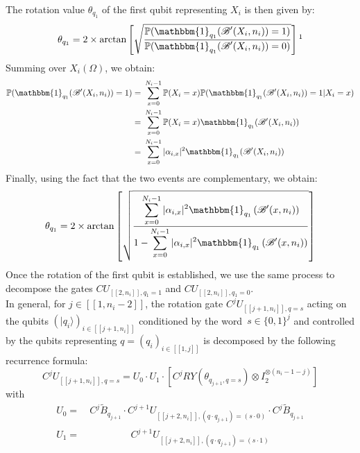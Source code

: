 The rotation value $\theta_{q_1}$ of the first qubit representing $X_i$ is then given by:
\begin{align*}
    \theta_{q_1} = 2\times\mathrm{arctan}\left[\sqrt{\frac{\displaystyle \mathbb{P}(\mathbbm{1}_{q_1}(\mathscr{B}'(X_i,n_i))=1)}{\displaystyle \mathbb{P}(\mathbbm{1}_{q_1}(\mathscr{B}'(X_i,n_i))=0)}}\right] \footnotemark
\end{align*}
Summing over $X_i(\Omega)$, we obtain:
\begin{align*}
    \mathbb{P}(\mathbbm{1}_{q_1}(\mathscr{B}'(X_i,n_i))=1) =&\ \sum_{x=0}^{N_i-1}\mathbb{P}(X_i=x)\mathbb{P}(\mathbbm{1}_{q_1}(\mathscr{B}'(X_i,n_i))=1|X_i=x) \\
    =&\ \sum_{x=0}^{N_i-1}\mathbb{P}(X_i=x)\mathbbm{1}_{q_1}(\mathscr{B}'(X_i,n_i)) \\
    =&\ \sum_{x=0}^{N_i-1}|\alpha_{i,x}|^2\mathbbm{1}_{q_1}(\mathscr{B}'(X_i,n_i))
\end{align*}
Finally, using the fact that the two events are complementary, we obtain: 
\begin{align*}
    \theta_{q_1} = 2\times\mathrm{arctan}\left[\sqrt{\frac{\displaystyle \sum_{x=0}^{N_i-1}|\alpha_{i,x}|^2\mathbbm{1}_{q_1}\left(\mathscr{B}'(x,n_i)\right)}{\displaystyle 1-\sum_{x=0}^{N_i-1}|\alpha_{i,x}|^2\mathbbm{1}_{q_1}\left(\mathscr{B}'(x,n_i)\right)}}\right]
\end{align*}
Once the rotation of the first qubit is established, we use the same process to decompose the gates $CU_{[\![2,n_i]\!],q_1=1}$ and $CU_{[\![2,n_i]\!],q_1=0}$. 
\\
In general, for $j\in[\![1,n_i-2]\!]$, the rotation gate $C^jU_{[\![j+1,n_i]\!], q=s}$ acting on the qubits $(|q_i\rangle)_{i\in[\![j+1,n_i]\!]}$ conditioned by the word\footnotemark \ $s \in \{0,1\}^j$ and controlled by the qubits representing $q=(q_i)_{i\in[\![1,j]\!]}$ is decomposed by the following recurrence formula:
\[
C^jU_{[\![j+1,n_i]\!], q=s} = U_0 \cdot U_1 \cdot [C^jRY(\theta_{q_{j+1}, q=s})\otimes I_2^{\otimes (n_i-1-j)}]
\]
with
\begin{align*}
U_0 =&\ C^j\tilde{B}_{q_{j+1}} \cdot C^{j+1}U_{[\![j+2,n_i]\!], (q\cdot q_{j+1})=(s \cdot 0)} \cdot  C^j\tilde{B}_{q_{j+1}}  \\
U_1 =&\ \ \qquad \qquad C^{j+1}U_{[\![j+2,n_i]\!], (q\cdot q_{j+1})=(s\cdot 1)}
\end{align*}
